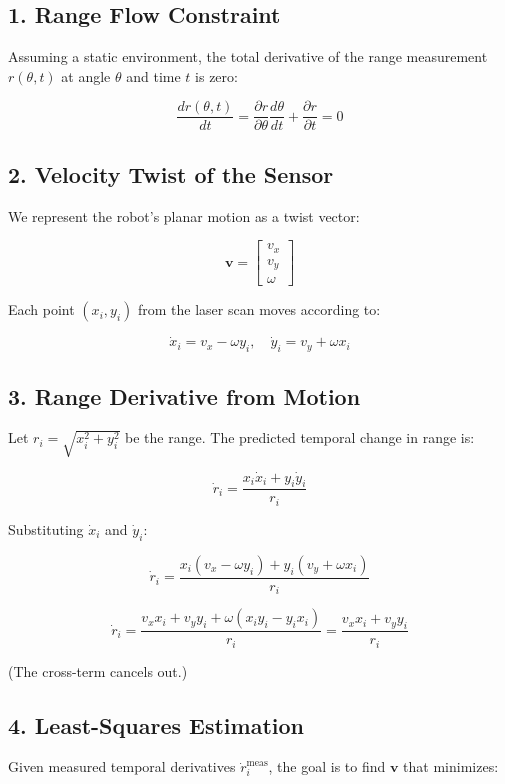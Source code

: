 \subsection*{1. Range Flow Constraint}

Assuming a static environment, the total derivative of the range measurement $r(\theta, t)$ at angle $\theta$ and time $t$ is zero:

\[
\frac{d r(\theta, t)}{dt} = \frac{\partial r}{\partial \theta} \frac{d\theta}{dt} + \frac{\partial r}{\partial t} = 0
\]

\subsection*{2. Velocity Twist of the Sensor}

We represent the robot’s planar motion as a twist vector:

\[
\mathbf{v} = 
\begin{bmatrix}
v_x \\
v_y \\
\omega
\end{bmatrix}
\]

Each point $(x_i, y_i)$ from the laser scan moves according to:

\[
\dot{x}_i = v_x - \omega y_i, \quad \dot{y}_i = v_y + \omega x_i
\]

\subsection*{3. Range Derivative from Motion}

Let $r_i = \sqrt{x_i^2 + y_i^2}$ be the range. The predicted temporal change in range is:

\[
\dot{r}_i = \frac{x_i \dot{x}_i + y_i \dot{y}_i}{r_i}
\]

Substituting $\dot{x}_i$ and $\dot{y}_i$:

\[
\dot{r}_i = \frac{x_i (v_x - \omega y_i) + y_i (v_y + \omega x_i)}{r_i}
\]

\[
\dot{r}_i = \frac{v_x x_i + v_y y_i + \omega (x_i y_i - y_i x_i)}{r_i} = \frac{v_x x_i + v_y y_i}{r_i}
\]

(The cross-term cancels out.)

\subsection*{4. Least-Squares Estimation}

Given measured temporal derivatives $\dot{r}_i^{\text{meas}}$, the goal is to find $\mathbf{v}$ that minimizes:

